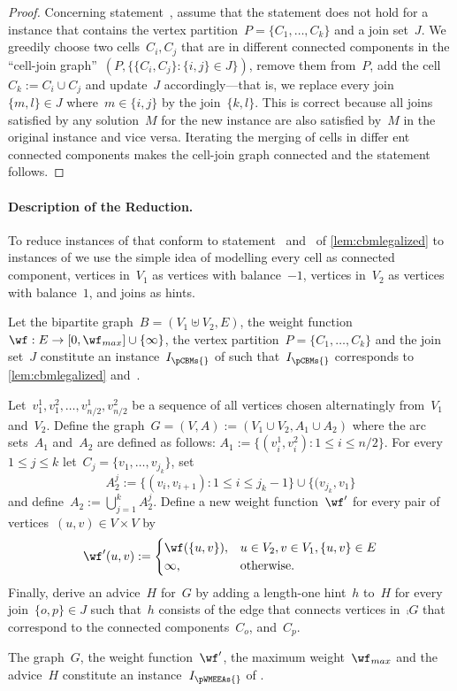 \begin{proof}
Concerning statement~, assume that the statement does not hold for a instance that contains the vertex partition~$P = \{C_1, \ldots, C_k\}$ and a join set~$J$. We greedily choose two cells~$C_i, C_j$ that are in different connected components in the ``cell-join graph''~$(P, \{\{C_i, C_j\}: \{i, j\} \in J\})$, remove them from~$P$, add the cell~$C_k := C_i \cup C_j$ and update~$J$ accordingly---that is, we replace every join~$\{m, l\} \in J$ where~$m \in \{i, j\}$ by the join~$\{k, l\}$. This is correct because all joins satisfied by any solution~$M$ for the new instance are also satisfied by~$M$ in the original instance and vice versa. Iterating the merging of cells in differ ent connected components makes the cell-join graph connected and the statement follows.
\end{proof}
\paragraph{Description of the Reduction.}
To reduce instances of \pCBMs{} that conform to statement~ and~ of \autoref{lem:cbmlegalized} to instances of \pWMEEAs{} we use the simple idea of modelling every cell as connected component, vertices in~$V_1$ as vertices with balance~$-1$, vertices in~$V_2$ as vertices with balance~$1$, and joins as hints.
\begin{construction}\label{cons:redcbmtoeea}
  Let the bipartite graph~$B = (V_1 \uplus V_2, E)$, the weight function~$\wf:E \rightarrow [0, \wf_{max}]\cup \{\infty\}$, the vertex partition~$P = \{C_1, \ldots, C_k\}$ and the join set~$J$ constitute an instance~$I_\pCBMs{}$ of \pCBMs{} such that~$I_\pCBMs{}$ corresponds to \autoref{lem:cbmlegalized} and~.

  Let~$v^1_1, v^2_1, \ldots, v^1_{n/2}, v^2_{n/2}$ be a sequence of all vertices chosen alternatingly from~$V_1$ and~$V_2$. Define the graph~$G = (V, A) := (V_1 \cup V_2, A_1 \cup A_2)$ where the arc sets~$A_1$ and~$A_2$ are defined as follows: $A_1 := \{(v_i^1, v_i^2) : 1 \leq i \leq n/2\}$. For every~$1 \leq j \leq k$ let~$C_j = \{v_1, \ldots, v_{j_k}\}$, set~\[A_2^j := \{(v_i, v_{i + 1}): 1 \leq i \leq j_k -1\} \cup \{ (v_{j_k}, v_1\}\] and define~$A_2 := \bigcup_{j = 1}^k A_2^j$. Define a new weight function~$\wf'$ for every pair of vertices~$(u, v) \in V \times V$ by
\[\wf'(u, v) := \begin{cases}
  \wf(\{u, v\}), & u \in V_2, v \in V_1, \{u, v\} \in E \\
  \infty, & \text{otherwise.}
\end{cases}
\]
Finally, derive an advice~$H$ for~$G$ by adding a length-one hint~$h$ to~$H$ for every join~$\{o, p\} \in J$ such that~$h$ consists of the edge that connects vertices in~$\comp{G}$ that correspond to the connected components~$C_o$, and~$C_p$.

The graph~$G$, the weight function~$\wf'$, the maximum weight~$\wf_{max}$ and the advice~$H$ constitute an instance~$I_\pWMEEAs{}$ of \pWMEEAs{}.
\end{construction}
